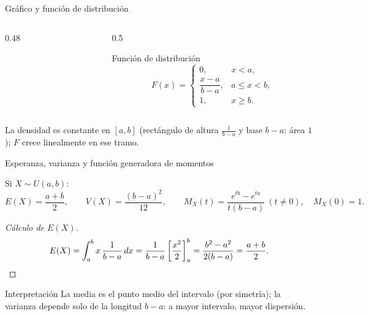 \documentclass[aspectratio=169,11pt]{beamer}
\begin{document}
\begin{frame}{Gráfico y función de distribución}
\begin{columns}
\begin{column}{0.48\textwidth}
\begin{center}
\end{center}
\end{column}
\begin{column}{0.5\textwidth}
\begin{block}{Función de distribución}
$$F(x) = \begin{cases} 0, & x<a, \\[2pt] \dfrac{x-a}{b-a}, & a\le x<b, \\[4pt] 1, & x\ge b.\end{cases}$$
\end{block}
\end{column}
\end{columns}
La densidad es constante en $[a,b]$ (rectángulo de altura $\frac{1}{b-a}$ y base $b-a$: área $1$); $F$ crece linealmente en ese tramo.
\end{frame}

\begin{frame}{Esperanza, varianza y función generadora de momentos}
\begin{theorem}
Si $X\sim U(a,b)$:
$$E(X) = \frac{a+b}{2}, \qquad V(X) = \frac{(b-a)^2}{12}, \qquad M_X(t) = \frac{e^{tb}-e^{ta}}{t(b-a)} \ (t\ne 0), \quad M_X(0)=1.$$
\end{theorem}

\begin{proof}[Cálculo de $E(X)$]
$$E(X) = \int_a^b x\,\frac{1}{b-a}\,dx = \frac{1}{b-a}\left[\frac{x^2}{2}\right]_a^b = \frac{b^2-a^2}{2(b-a)} = \frac{a+b}{2}. \qedhere$$
\end{proof}

\begin{alertblock}{Interpretación}
La media es el punto medio del intervalo (por simetría); la varianza depende solo de la longitud $b-a$: a mayor intervalo, mayor dispersión.
\end{alertblock}
\end{frame}
\end{document}
